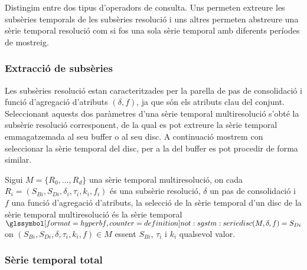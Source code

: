 Distingim entre dos tipus d'operadors de consulta. Uns permeten
extreure les subsèries temporals de les subsèries resolució i uns altres
permeten abstreure una sèrie temporal resolució com si fos una sola
sèrie temporal amb diferents períodes de mostreig.


\subsubsection{Extracció de subsèries}


Les subsèries resolució estan caracteritzades per la parella de pas de
consolidació i funció d'agregació d'atributs $(\delta,f)$, ja que són
els atributs clau del conjunt. Seleccionant aquests dos paràmetres
d'una sèrie temporal multiresolució s'obté la subsèrie resolució
corresponent, de la qual es pot extreure la sèrie temporal
emmagatzemada al seu buffer o al seu disc. A continuació mostrem con
seleccionar la sèrie temporal del disc, per a la del buffer es pot
procedir de forma similar.

\begin{definition}
  Sigui $M=\{R_0,\dotsc,R_{d}\}$ una sèrie temporal multiresolució, on
  cada $R_i=(S_{Bi},S_{Di},\delta_i,\tau_i,k_i,f_i)$ és una subsèrie
  resolució, $\delta$ un pas de consolidació i $f$ una funció
  d'agregació d'atributs, la selecció de la sèrie temporal d'un disc
  de la sèrie temporal multiresolució és la sèrie temporal
  $\glssymboldef{not:sgstm:seriedisc}(M,\delta,f)= S_{Di}$ on
  $(S_{Bi},S_{Di},\delta,\tau_i,k_i,f) \in M$ essent $S_{Bi}$,
  $\tau_i$ i $k_i$ qualsevol valor.
\end{definition}




\subsubsection{Sèrie temporal total}




